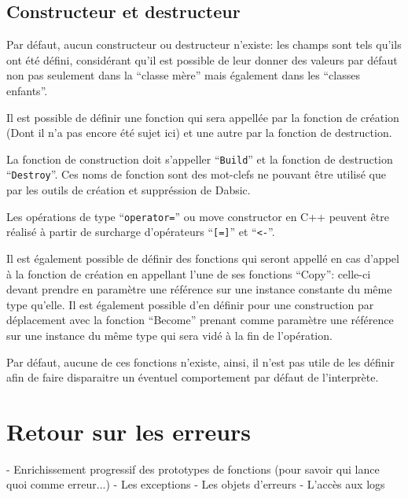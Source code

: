 \documentclass[a5paper, 12pt]{book}
\begin{document}
\section{Constructeur et destructeur}

Par défaut, aucun constructeur ou destructeur n'existe: les champs
sont tels qu'ils ont été défini, considérant qu'il est possible
de leur donner des valeurs par défaut non pas seulement dans
la ``classe mère'' mais également dans les ``classes enfants''.

Il est possible de définir une fonction qui sera appellée
par la fonction de création (Dont il n'a pas encore été sujet
ici) et une autre par la fonction de destruction.

La fonction de construction doit s'appeller ``\verb!Build!'' et
la fonction de destruction ``\verb!Destroy!''. Ces noms de fonction
sont des mot-clefs ne pouvant être utilisé que par les
outils de création et suppréssion de Dabsic.

Les opérations de type ``\verb!operator=!'' ou move constructor
en C++ peuvent être réalisé à partir de surcharge d'opérateurs
``\verb![=]!'' et ``\verb!<-!''.

Il est également possible de définir des fonctions qui
seront appellé en cas d'appel à la fonction de création
en appellant l'une de ses fonctions ``Copy'': celle-ci
devant prendre en paramètre une référence sur une instance
constante du même type qu'elle. Il est également
possible d'en définir pour une construction par déplacement
avec la fonction ``Become'' prenant comme paramètre
une référence sur une instance du même type qui sera
vidé à la fin de l'opération.

Par défaut, aucune de ces fonctions n'existe, ainsi, il
n'est pas utile de les définir afin de faire disparaitre
un éventuel comportement par défaut de l'interprète.


\chapter{Retour sur les erreurs}

- Enrichissement progressif des prototypes de fonctions (pour savoir
qui lance quoi comme erreur...)
- Les exceptions
- Les objets d'erreurs
- L'accès aux logs

\end{document}
